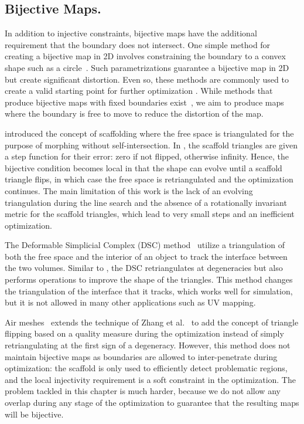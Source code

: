 \subsection*{Bijective Maps.}
In addition to injective constraints, bijective maps have the additional requirement that the boundary does not intersect.  One simple method for creating a bijective map in 2D involves constraining the boundary to a convex shape such as a circle~\cite{Tutte:1963,Floater:97}.  
Such parametrizations guarantee a bijective map in 2D but create significant distortion.  Even so, these methods are commonly used to create a valid starting point for further optimization \cite{Schuller:2013,Smith:2015,rabinovich2017scalable}. 
While methods that produce bijective maps with fixed boundaries exist~\cite{Weber:2014:LIP,Campen:2016}, we aim to produce maps where the boundary is free to move to reduce the distortion of the map.

\cite{Gotsman:2001, surazhsky2001morphing} introduced the concept of scaffolding where the free space is triangulated for the purpose of morphing without self-intersection. In \cite{Zhang:2005}, the scaffold triangles are given a step function for their error: zero if not flipped, otherwise infinity. Hence, the bijective condition becomes local in that the shape can evolve until a scaffold triangle flips, in which case the free space is retriangulated and the optimization continues. The main limitation of this work is the lack of an evolving triangulation during the line search and the absence of a rotationally invariant metric for the scaffold triangles, which lead to very small steps and an inefficient optimization.

The Deformable Simplicial Complex (DSC) method~\cite{Misztal:2012} utilize a triangulation of both the free space and the interior of an object to track the interface between the two volumes.  Similar to \cite{Zhang:2005}, the DSC retriangulates at degeneracies but also performs operations to improve the shape of the triangles.  This method changes the triangulation of the interface that it tracks, which works well for simulation, but it is not allowed in many other applications such as UV mapping.

Air meshes~\cite{Muller:2015} extends the technique of Zhang et al.~\cite{Zhang:2005} to add the concept of triangle flipping based on a quality measure during the optimization instead of simply retriangulating at the first sign of a degeneracy. However, this method does not maintain bijective maps as boundaries are allowed to inter-penetrate during optimization: the scaffold is only used to efficiently detect problematic regions, and the local injectivity requirement is a soft constraint in the optimization. The problem tackled in this chapter is much harder, because we do not allow any overlap during any stage of the optimization to guarantee that the resulting maps will be bijective.

